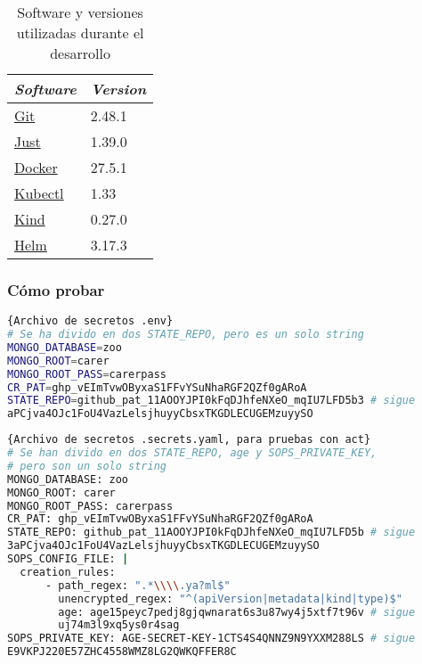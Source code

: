 \begin{table}
  \centering
  \begin{tabular}{|l|l|}
    \hline
    \textit{Software} & \textit{Version} \\ \hline
    \href{https://git-scm.com/book/en/v2/Getting-Started-Installing-Git}{Git} & 2.48.1 \\ \hline
    \href{https://github.com/casey/just?tab=readme-ov-file#installation}{Just} & 1.39.0 \\ \hline
    \href{https://docs.docker.com/desktop/}{Docker} & 27.5.1 \\ \hline
    \href{https://kubernetes.io/docs/tasks/tools/#kubectl}{Kubectl} & 1.33 \\ \hline
    \href{https://kubernetes.io/docs/tasks/tools/#kind}{Kind} & 0.27.0 \\ \hline
    \href{https://helm.sh/docs/intro/install/}{Helm} & 3.17.3 \\ \hline
  \end{tabular}
  \caption{Software y versiones utilizadas durante el desarrollo}
  \label{table:software}
\end{table}

\subsubsection*{Cómo probar}

\begin{lstlisting}[language=bash,label=lst:env-file]{Archivo de secretos .env}
# Se ha divido en dos STATE_REPO, pero es un solo string
MONGO_DATABASE=zoo
MONGO_ROOT=carer
MONGO_ROOT_PASS=carerpass
CR_PAT=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
STATE_REPO=github_pat_11AOOYJPI0kFqDJhfeNXeO_mqIU7LFD5b3 # sigue
aPCjva4OJc1FoU4VazLelsjhuyyCbsxTKGDLECUGEMzuyySO
\end{lstlisting}

\begin{lstlisting}[language=bash,label=lst:secrets-file]{Archivo de secretos .secrets.yaml, para pruebas con act}
# Se han divido en dos STATE_REPO, age y SOPS_PRIVATE_KEY,
# pero son un solo string
MONGO_DATABASE: zoo
MONGO_ROOT: carer
MONGO_ROOT_PASS: carerpass
CR_PAT: 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
STATE_REPO: github_pat_11AOOYJPI0kFqDJhfeNXeO_mqIU7LFD5b # sigue
3aPCjva4OJc1FoU4VazLelsjhuyyCbsxTKGDLECUGEMzuyySO
SOPS_CONFIG_FILE: |
  creation_rules:
      - path_regex: ".*\\\\.ya?ml$"
        unencrypted_regex: "^(apiVersion|metadata|kind|type)$"
        age: age15peyc7pedj8gjqwnarat6s3u87wy4j5xtf7t96v # sigue
        uj74m3l9xq5ys0r4sag
SOPS_PRIVATE_KEY: AGE-SECRET-KEY-1CTS4S4QNNZ9N9YXXM288LS # sigue
E9VKPJ220E57ZHC4558WMZ8LG2QWKQFFER8C
\end{lstlisting}


